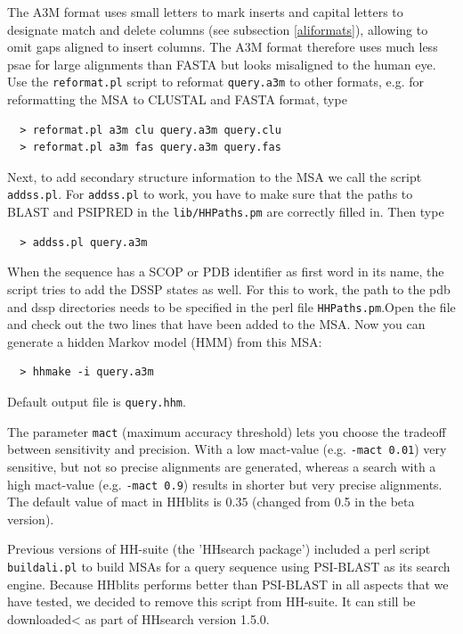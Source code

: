 \documentclass[11pt,a4paper]{article}
\begin{document}
The A3M format uses small letters to mark inserts and capital letters to designate match and delete columns (see subsection \ref{aliformats}), allowing to omit gaps aligned to insert columns. The A3M format therefore uses much less psae for large alignments than FASTA but looks misaligned to the human eye. Use the \verb`reformat.pl` script to reformat \verb`query.a3m` to other formats, e.g. for reformatting the MSA to CLUSTAL and FASTA format, type

\begin{verbatim}
  > reformat.pl a3m clu query.a3m query.clu
  > reformat.pl a3m fas query.a3m query.fas
\end{verbatim}

Next, to add secondary structure information to the MSA we call the script \verb`addss.pl`. For \verb`addss.pl` to work, you have to make sure that the paths to BLAST and PSIPRED in the \verb`lib/HHPaths.pm` are correctly filled in. Then type

\begin{verbatim}
  > addss.pl query.a3m
\end{verbatim}
When the sequence has a SCOP or PDB identifier as first word in its name, the script tries to add the DSSP states as well. For this to work, the path to the pdb and dssp directories needs to be specified in the perl file \verb`HHPaths.pm`.Open the file and check out the two lines that have been added to the MSA. Now you can generate a hidden Markov model (HMM) from this MSA:
\begin{verbatim}
  > hhmake -i query.a3m
\end{verbatim}
Default output file is \verb`query.hhm`.

The parameter \verb`mact` (maximum accuracy threshold) lets you choose the tradeoff between sensitivity and 
precision. With a low mact-value (e.g. \verb`-mact 0.01`) very sensitive, but not 
so precise alignments are generated, whereas a search with a high mact-value (e.g. \verb`-mact 0.9`) results in shorter but very precise alignments. The default value of mact in HHblits is $0.35$ (changed from 0.5 in the beta version). 

Previous versions of HH-suite (the 'HHsearch package') included a perl script \verb`buildali.pl` to build MSAs for a query sequence using PSI-BLAST as its search engine. Because HHblits performs better than PSI-BLAST in all aspects that we have tested, we decided to remove this script from HH-suite. It can still be downloaded< as part of HHsearch version 1.5.0.
\end{document}
